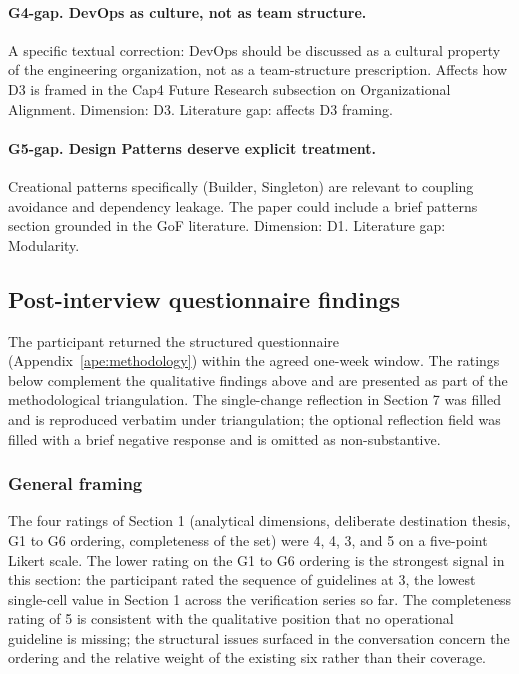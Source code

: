 \paragraph*{G4-gap. DevOps as culture, not as team structure.} A specific textual correction: DevOps should be discussed as a cultural property of the engineering organization, not as a team-structure prescription. Affects how D3 is framed in the Cap4 Future Research subsection on Organizational Alignment. Dimension: D3. Literature gap: affects D3 framing.

\paragraph*{G5-gap. Design Patterns deserve explicit treatment.} Creational patterns specifically (Builder, Singleton) are relevant to coupling avoidance and dependency leakage. The paper could include a brief patterns section grounded in the GoF literature. Dimension: D1. Literature gap: Modularity.

\subsection*{Post-interview questionnaire findings}

The participant returned the structured questionnaire (Appendix~\ref{ape:methodology}) within the agreed one-week window. The ratings below complement the qualitative findings above and are presented as part of the methodological triangulation. The single-change reflection in Section 7 was filled and is reproduced verbatim under triangulation; the optional reflection field was filled with a brief negative response and is omitted as non-substantive.

\subsubsection*{General framing}

The four ratings of Section 1 (analytical dimensions, deliberate destination thesis, G1 to G6 ordering, completeness of the set) were 4, 4, 3, and 5 on a five-point Likert scale. The lower rating on the G1 to G6 ordering is the strongest signal in this section: the participant rated the sequence of guidelines at 3, the lowest single-cell value in Section 1 across the verification series so far. The completeness rating of 5 is consistent with the qualitative position that no operational guideline is missing; the structural issues surfaced in the conversation concern the ordering and the relative weight of the existing six rather than their coverage.

